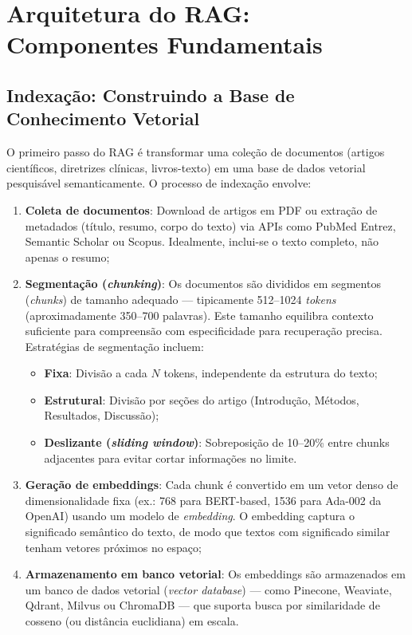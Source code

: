 \section{Arquitetura do RAG: Componentes Fundamentais}

\subsection{Indexação: Construindo a Base de Conhecimento Vetorial}

O primeiro passo do RAG é transformar uma coleção de documentos (artigos científicos, diretrizes clínicas, livros-texto) em uma base de dados vetorial pesquisável semanticamente. O processo de indexação envolve:

\begin{enumerate}
    \item \textbf{Coleta de documentos}: Download de artigos em PDF ou extração de metadados (título, resumo, corpo do texto) via APIs como PubMed Entrez, Semantic Scholar ou Scopus. Idealmente, inclui-se o texto completo, não apenas o resumo;

    \item \textbf{Segmentação (\textit{chunking})}: Os documentos são divididos em segmentos (\textit{chunks}) de tamanho adequado --- tipicamente 512--1024 \textit{tokens} (aproximadamente 350--700 palavras). Este tamanho equilibra contexto suficiente para compreensão com especificidade para recuperação precisa. Estratégias de segmentação incluem:
    \begin{itemize}
        \item \textbf{Fixa}: Divisão a cada $N$ tokens, independente da estrutura do texto;
        \item \textbf{Estrutural}: Divisão por seções do artigo (Introdução, Métodos, Resultados, Discussão);
        \item \textbf{Deslizante (\textit{sliding window})}: Sobreposição de 10--20\% entre chunks adjacentes para evitar cortar informações no limite.
    \end{itemize}

    \item \textbf{Geração de embeddings}: Cada chunk é convertido em um vetor denso de dimensionalidade fixa (ex.: 768 para BERT-based, 1536 para Ada-002 da OpenAI) usando um modelo de \textit{embedding}. O embedding captura o significado semântico do texto, de modo que textos com significado similar tenham vetores próximos no espaço;

    \item \textbf{Armazenamento em banco vetorial}: Os embeddings são armazenados em um banco de dados vetorial (\textit{vector database}) --- como Pinecone, Weaviate, Qdrant, Milvus ou ChromaDB --- que suporta busca por similaridade de cosseno (ou distância euclidiana) em escala.
\end{enumerate}

